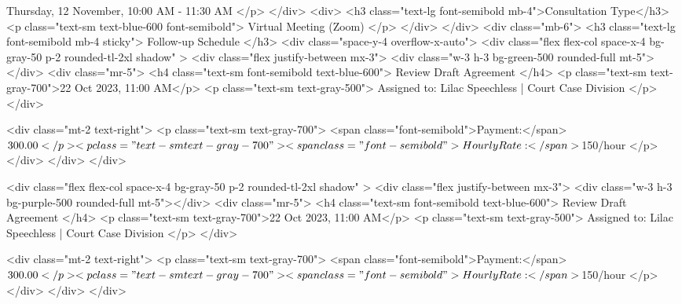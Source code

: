                 Thursday, 12 November, 10:00 AM - 11:30 AM
              </p>
            </div>
            <div>
              <h3 class="text-lg font-semibold mb-4">Consultation Type</h3>
              <p class="text-sm text-blue-600 font-semibold">
                Virtual Meeting (Zoom)
              </p>
            </div>
          </div>
          <div class="mb-6">
            <h3 class="text-lg font-semibold mb-4 sticky">
              Follow-up Schedule
            </h3>
            <div class="space-y-4 overflow-x-auto">
              <div
                class="flex flex-col space-x-4 bg-gray-50 p-2 rounded-tl-2xl shadow"
              >
                <div class="flex justify-between mx-3">
                  <div class="w-3 h-3 bg-green-500 rounded-full mt-5"></div>
                  <div class="mr-5">
                    <h4 class="text-sm font-semibold text-blue-600">
                      Review Draft Agreement
                    </h4>
                    <p class="text-sm text-gray-700">22 Oct 2023, 11:00 AM</p>
                    <p class="text-sm text-gray-500">
                      Assigned to: Lilac Speechless | Court Case Division
                    </p>
                  </div>

                  <div class="mt-2 text-right">
                    <p class="text-sm text-gray-700">
                      <span class="font-semibold">Payment:</span> $300.00
                    </p>
                    <p class="text-sm text-gray-700">
                      <span class="font-semibold">Hourly Rate:</span> $150/hour
                    </p>
                  </div>
                </div>
              </div>

              <div
                class="flex flex-col space-x-4 bg-gray-50 p-2 rounded-tl-2xl shadow"
              >
                <div class="flex justify-between mx-3">
                  <div class="w-3 h-3 bg-purple-500 rounded-full mt-5"></div>
                  <div class="mr-5">
                    <h4 class="text-sm font-semibold text-blue-600">
                      Review Draft Agreement
                    </h4>
                    <p class="text-sm text-gray-700">22 Oct 2023, 11:00 AM</p>
                    <p class="text-sm text-gray-500">
                      Assigned to: Lilac Speechless | Court Case Division
                    </p>
                  </div>

                  <div class="mt-2 text-right">
                    <p class="text-sm text-gray-700">
                      <span class="font-semibold">Payment:</span> $300.00
                    </p>
                    <p class="text-sm text-gray-700">
                      <span class="font-semibold">Hourly Rate:</span> $150/hour
                    </p>
                  </div>
                </div>
              </div>

